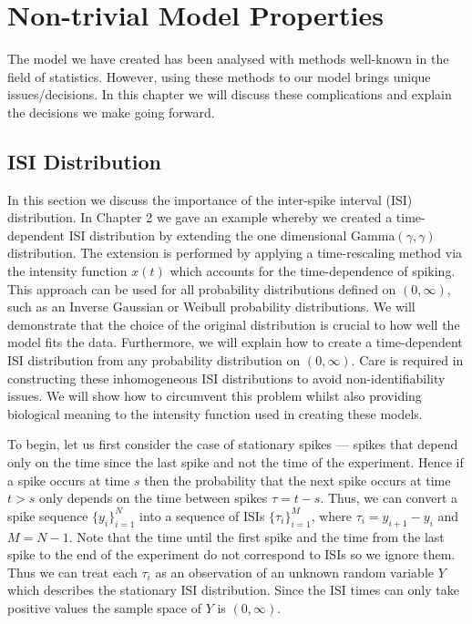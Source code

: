 \documentclass[oneside, 12 pt]{book}
\begin{document}
\chapter{Non-trivial Model Properties}
The model we have created has been analysed with methods well-known in the field of statistics. However, using these methods to our model brings unique issues/decisions. In this chapter we will discuss these complications and explain the decisions we make going forward. 

\section{ISI Distribution}

In this section we discuss the importance of the inter-spike interval (ISI) distribution. In Chapter 2 we gave an example whereby we created a time-dependent ISI distribution by extending the one dimensional  Gamma$(\gamma, \gamma)$ distribution. The extension is performed by applying a time-rescaling method via the intensity function $x(t)$ which accounts for the time-dependence of  spiking. This approach can be used for all  probability distributions defined on $(0,\infty)$, such as an Inverse Gaussian or Weibull probability distributions. We will demonstrate that the choice of the original distribution is crucial to how well the model fits the  data. Furthermore, we will explain how to create a time-dependent ISI distribution from any probability distribution on $(0,\infty)$. Care is required in constructing these inhomogeneous ISI distributions to avoid non-identifiability issues. We will show how to circumvent this problem whilst also providing biological meaning to the intensity function used in creating these models. 

To begin, let us first consider the case of stationary  spikes --- spikes that depend only on the time since the last spike and not the time of the experiment. Hence if a  spike occurs at time $s$ then the probability that the next spike occurs at time $t>s$ only depends on the time between spikes $\tau = t-s$. Thus, we can convert a spike sequence $\{y_i\}^N_{i=1}$ into a sequence of ISIs $\{\tau_i\}^{M}_{i=1}$, where $\tau_i = y_{i+1} - y_{i}$ and $M = N-1$. Note that the time until the first spike  and the time from the last spike to the end of the experiment do not correspond to ISIs so we ignore them. Thus we can treat each $\tau_i$ as an observation of an unknown random variable $Y$ which describes the stationary ISI distribution. Since the ISI times can only take positive values the sample space of $Y$ is $(0,\infty)$. 
\end{document}
